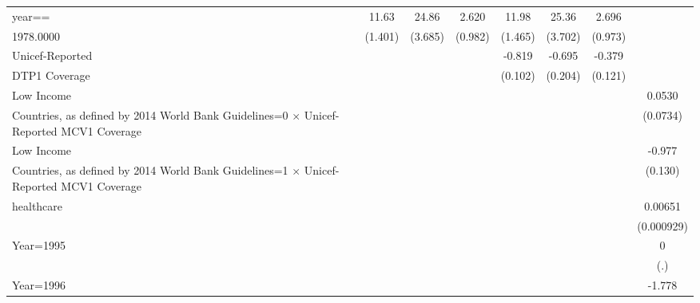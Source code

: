 \begin{table}[htbp]
\begin{tabular}{l*{7}{c}}
year==          &    11.63\sym{***}&    24.86\sym{***}&    2.620\sym{*}  &    11.98\sym{***}&    25.36\sym{***}&    2.696\sym{**} &                  \\
1978.0000       &  (1.401)         &  (3.685)         &  (0.982)         &  (1.465)         &  (3.702)         &  (0.973)         &                  \\
Unicef-Reported &                  &                  &                  &   -0.819\sym{***}&   -0.695\sym{**} &   -0.379\sym{**} &                  \\
DTP1 Coverage   &                  &                  &                  &  (0.102)         &  (0.204)         &  (0.121)         &                  \\
Low Income      &                  &                  &                  &                  &                  &                  &   0.0530         \\
Countries, as defined by 2014 World Bank Guidelines=0 $\times$ Unicef-Reported MCV1 Coverage&                  &                  &                  &                  &                  &                  & (0.0734)         \\
Low Income      &                  &                  &                  &                  &                  &                  &   -0.977\sym{***}\\
Countries, as defined by 2014 World Bank Guidelines=1 $\times$ Unicef-Reported MCV1 Coverage&                  &                  &                  &                  &                  &                  &  (0.130)         \\
healthcare      &                  &                  &                  &                  &                  &                  &  0.00651\sym{***}\\
                &                  &                  &                  &                  &                  &                  &(0.000929)         \\
Year=1995       &                  &                  &                  &                  &                  &                  &        0         \\
                &                  &                  &                  &                  &                  &                  &      (.)         \\
Year=1996       &                  &                  &                  &                  &                  &                  &   -1.778\sym{***}\\

\end{tabular}
\end{table}
